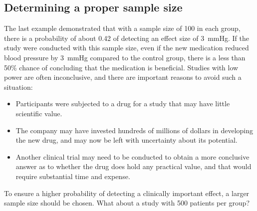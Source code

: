 \textD{\newpage}


\subsection{Determining a proper sample size}

The last example demonstrated that with a sample size of 100 in each group, there is a probability of about 0.42 of detecting an effect size of 3~mmHg. If the study were conducted with this sample size, even if the new medication reduced blood pressure by 3~mmHg compared to the control group, there is a less than 50\% chance of concluding that the medication is beneficial. Studies with low power are often inconclusive, and there are important reasons to avoid such a situation:

\begin{itemize}
	\setlength{\itemsep}{0mm}
	\item Participants were subjected to a drug for a study that may have little scientific value. 
	
	\item The company may have invested hundreds of millions of dollars in developing the new drug, and may now be left with uncertainty about its potential. 
	
	\item Another clinical trial may need to be conducted to obtain a more conclusive answer as to whether the drug does hold any practical value, and that would require substantial time and expense. 
\end{itemize}

To ensure a higher probability of detecting a clinically important effect, a larger sample size should be chosen. What about a study with 500 patients per group?

